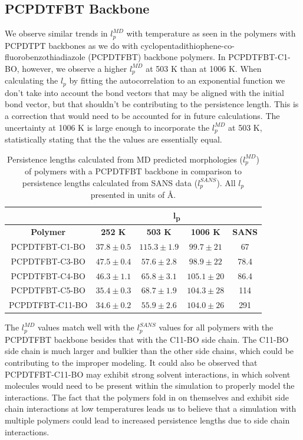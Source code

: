 \subsection{PCPDTFBT Backbone}
\par We observe similar trends in $l_p^{MD}$ with temperature as seen in the polymers with PCPDTPT backbones as we do with cyclopentadithiophene-co- fluorobenzothiadiazole (PCPDTFBT) backbone polymers. In PCPDTFBT-C1-BO, however, we observe a higher $l_p^{MD}$ at 503 K than at 1006 K. When calculating the $l_p$ by fitting the autocorrelation to an exponential function we don't take into account the bond vectors that may be aligned with the initial bond vector, but that shouldn't be contributing to the persistence length. This is a correction that would need to be accounted for in future calculations. The uncertainty at 1006 K is large enough to incorporate the $l_p^{MD}$ at 503 K, statistically stating that the the values are essentially equal. 
\begin{table}[ht]
    \centering
    \begin{tabular}{c|c|c|c|c}
                        &  \multicolumn{4}{c}{\textbf{l\textsubscript{p}}}  \\
        \hline
        \textbf{Polymer}  & \textbf{252 K}& \textbf{503 K}& \textbf{1006 K}& \textbf{SANS}\\
        \hline
        PCPDTFBT-C1-BO    &   $37.8 \pm 0.5$    &	$115.3 \pm 1.9$   &   $99.7 \pm 21$&    67	 \\
        PCPDTFBT-C3-BO    &   $47.5 \pm 0.4$    &	$57.6 \pm 2.8$    &   $98.9  \pm 22$&    78.4   \\
        PCPDTFBT-C4-BO    &   $46.3 \pm 1.1$    &	$65.8 \pm 3.1$    &   $105.1 \pm 20$&    86.4   \\
        PCPDTFBT-C5-BO    &   $35.4 \pm 0.3$    &	$68.7\pm 1.9$     &   $104.3 \pm 28$&    114	 \\
        PCPDTFBT-C11-BO   &   $34.6 \pm 0.2$    &	$55.9 \pm 2.6$    &   $104.0 \pm 26$&    291	 \\
    \end{tabular}
    \caption{Persistence lengths calculated from MD predicted morphologies ($l_p^{MD}$)  of polymers with a PCPDTFBT backbone in comparison to persistence lengths calculated from SANS data ($l_p^{SANS}$). All $l_p$ presented in units of \AA.}
    \label{tab:lp_pcpdtfbt}
\end{table}
\par The $l_p^{MD}$ values match well with the $l_p^{SANS}$ values for all polymers with the PCPDTFBT backbone besides that with the C11-BO side chain. The C11-BO side chain is much larger and bulkier than the other side chains, which could be contributing to the improper modeling. It could also be observed that PCPDTFBT-C11-BO may exhibit strong solvent interactions, in which solvent molecules would need to be present within the simulation to properly model the interactions. The fact that the polymers fold in on themselves and exhibit side chain interactions at low temperatures leads us to believe that a simulation with multiple polymers could lead to increased persistence lengths due to side chain interactions. 
